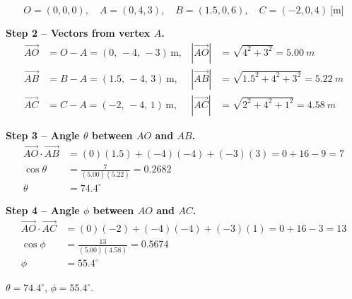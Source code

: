 \documentclass[11pt]{article}
\newcommand{\eqlabel}[1]{\textbf{#1}}
\begin{document}
\[
    O=(0,0,0),\quad A=(0,4,3),\quad B=(1.5,0,6),\quad C=(-2,0,4)\ \text{[m]}
\]

\eqlabel{Step 2 -- Vectors from vertex $A$.}
\begin{align*}
    \vec{AO} &= O-A = (0,\,-4,\,-3)\,\text{m}, & |\vec{AO}| &= \sqrt{4^2+3^2} = \SI{5.00}{m} \\
    \vec{AB} &= B-A = (1.5,\,-4,\,3)\,\text{m}, & |\vec{AB}| &= \sqrt{1.5^2+4^2+3^2} = \SI{5.22}{m} \\
    \vec{AC} &= C-A = (-2,\,-4,\,1)\,\text{m}, & |\vec{AC}| &= \sqrt{2^2+4^2+1^2} = \SI{4.58}{m}
\end{align*}

\eqlabel{Step 3 -- Angle $\theta$ between $AO$ and $AB$.}
\begin{align*}
    \vec{AO}\cdot\vec{AB} &= (0)(1.5)+(-4)(-4)+(-3)(3) = 0+16-9 = 7 \\
    \cos\theta &= \frac{7}{(5.00)(5.22)} = 0.2682 \\
    \theta &= 74.4^\circ
\end{align*}

\eqlabel{Step 4 -- Angle $\phi$ between $AO$ and $AC$.}
\begin{align*}
    \vec{AO}\cdot\vec{AC} &= (0)(-2)+(-4)(-4)+(-3)(1) = 0+16-3 = 13 \\
    \cos\phi &= \frac{13}{(5.00)(4.58)} = 0.5674 \\
    \phi &= 55.4^\circ
\end{align*}

\begin{finalanswer}
    $\theta = 74.4^\circ$, \quad $\phi = 55.4^\circ$.
\end{finalanswer}
\end{document}
